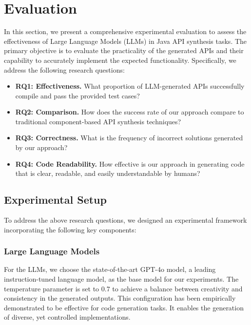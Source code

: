 \section{Evaluation}
\label{sec:evaluation}
In this section, we present a comprehensive experimental evaluation to assess the effectiveness of Large Language Models (LLMs) in Java API synthesis tasks. The primary objective is to evaluate the practicality of the generated APIs and their capability to accurately implement the expected functionality. Specifically, we address the following research questions:

\begin{itemize}
    \item \textbf{RQ1: Effectiveness.} What proportion of LLM-generated APIs successfully compile and pass the provided test cases?
    \item \textbf{RQ2: Comparison.} How does the success rate of our approach compare to traditional component-based API synthesis techniques?
    \item \textbf{RQ3: Correctness.} What is the frequency of incorrect solutions generated by our approach? 
    \item \textbf{RQ4: Code Readability.} How effective is our approach in generating code that is clear, readable, and easily understandable by humans?
\end{itemize}

\subsection{Experimental Setup}
\label{sec:sec41}
To address the above research questions, we designed an experimental framework incorporating the following key components:

\subsubsection{Large Language Models}
\label{sec:sec411}
For the LLMs, we choose the state-of-the-art GPT-4o model, a leading instruction-tuned language model, as the base model for our experiments. The temperature parameter is set to 0.7 to achieve a balance between creativity and consistency in the generated outputs. This configuration has been empirically demonstrated to be effective for code generation tasks\cite{endres2024can}. It enables the generation of diverse, yet controlled implementations. 

